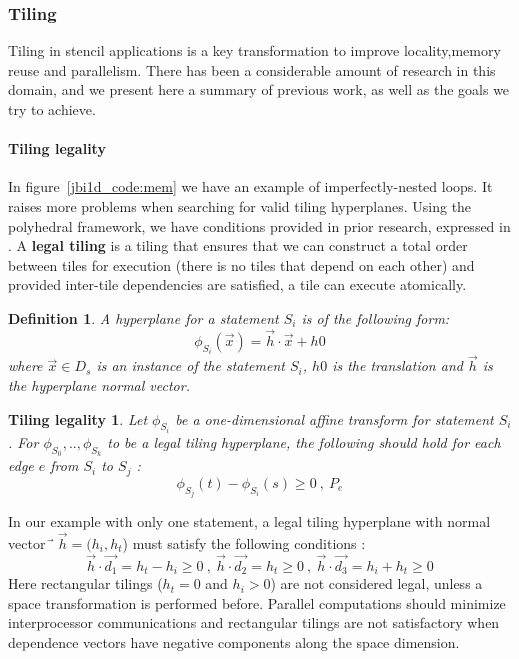\documentclass[a4paper,11pt]{article}
\begin{document}
\subsubsection{Tiling}
  Tiling in stencil applications is a key transformation to improve locality,memory reuse
  and parallelism. There has been a considerable amount of research in this domain, and
  we present here a summary of previous work, as well as the goals we try to achieve.
  
  \newtheorem{depsdef}{Definition}
  \newtheorem{legality}{Tiling legality}
  
  \paragraph{Tiling legality} In figure~\ref{jbi1d_code:mem} we have an example of imperfectly-nested loops.
  It raises  more problems when searching for valid tiling hyperplanes. Using the polyhedral framework, 
  we have conditions provided in prior research, expressed in \cite{bondhugula_automatic_2008}. A 
  \textbf{legal tiling} is a tiling that ensures that we can construct a total order between tiles 
  for execution (there is no tiles that depend on each other) and provided inter-tile dependencies
  are satisfied, a tile can execute atomically.
  \begin{depsdef}
    A hyperplane for a statement $S_i$ is of the following form:
      \[\phi_{S_i}(\vec{x}) =  \vec{h} \cdot \vec{x} + h0 \]
  where $ \vec{x} \in D_s$ is an instance of the statement $S_i$, 
  $h0$ is the translation and $\vec{h}$ is the hyperplane normal vector.
  \end{depsdef}
  
  \begin{legality}
    Let $\phi_{S_i}$ be a one-dimensional affine transform for statement
    $S_i$. For ${\phi_{S_0} , .., \phi_{S_k}}$ to be a legal tiling hyperplane, 
    the following should hold for each edge $e$ from $S_i$ to $S_j$ :
    \[\phi_{S_j}(t) - \phi_{S_i}(s) \geq 0 \ , \ P_e\]
  \end{legality}
  In our example with only one statement, a legal tiling hyperplane with normal vector
  $⃗\vec{h} = (h_i, h_t$) must satisfy the following conditions :
  \[\vec{h} \cdot \vec{d_1} = h_t - h_i \geq 0 \ , \ 
  \vec{h} \cdot \vec{d_2} = h_t \geq 0 \ , \ 
  \vec{h} \cdot \vec{d_3} = h_i + h_t \geq 0\]
  Here rectangular tilings ($h_t = 0$ and $h_i > 0$) are not considered legal, unless 
  a space transformation is performed before.
  Parallel computations should minimize interprocessor communications and rectangular tilings are not 
  satisfactory when dependence vectors have negative components along the space dimension.
\end{document}
